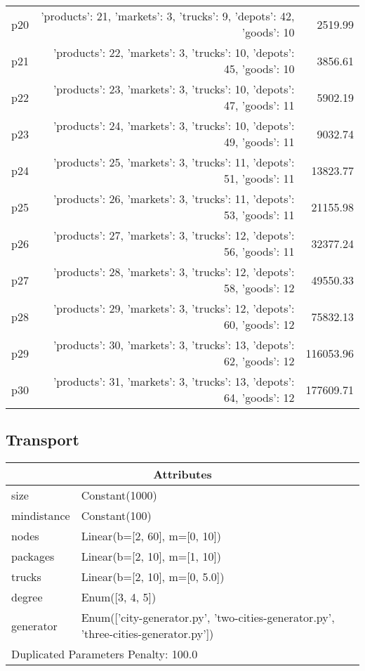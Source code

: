 \documentclass{article}
\begin{document}
\begin{center}
\begin{tabular}{@{}l|r|r@{}}
  p20&{'products': 21, 'markets': 3, 'trucks': 9, 'depots': 42, 'goods': 10}&2519.99\\
  p21&{'products': 22, 'markets': 3, 'trucks': 10, 'depots': 45, 'goods': 10}&3856.61\\
  p22&{'products': 23, 'markets': 3, 'trucks': 10, 'depots': 47, 'goods': 11}&5902.19\\
  p23&{'products': 24, 'markets': 3, 'trucks': 10, 'depots': 49, 'goods': 11}&9032.74\\
  p24&{'products': 25, 'markets': 3, 'trucks': 11, 'depots': 51, 'goods': 11}&13823.77\\
  p25&{'products': 26, 'markets': 3, 'trucks': 11, 'depots': 53, 'goods': 11}&21155.98\\
  p26&{'products': 27, 'markets': 3, 'trucks': 12, 'depots': 56, 'goods': 11}&32377.24\\
  p27&{'products': 28, 'markets': 3, 'trucks': 12, 'depots': 58, 'goods': 12}&49550.33\\
  p28&{'products': 29, 'markets': 3, 'trucks': 12, 'depots': 60, 'goods': 12}&75832.13\\
  p29&{'products': 30, 'markets': 3, 'trucks': 13, 'depots': 62, 'goods': 12}&116053.96\\
  p30&{'products': 31, 'markets': 3, 'trucks': 13, 'depots': 64, 'goods': 12}&177609.71
                            \end{tabular}
                            \end{center}
                    
                            \newpage \subsection{Transport}
                    \begin{center}
                    \begin{tabular}{@{}p{}p{}@{}}
                    \multicolumn{2}{c}{\bf \large Attributes}\\\midrule
                    size & Constant(1000)\\
mindistance & Constant(100)\\
nodes & Linear(b=[2, 60], m=[0, 10])\\
packages & Linear(b=[2, 10], m=[1, 10])\\
trucks & Linear(b=[2, 10], m=[0, 5.0])\\
degree & Enum([3, 4, 5])\\
generator & Enum(['city-generator.py', 'two-cities-generator.py', 'three-cities-generator.py']) \\\midrule
                    \multicolumn{2}{l}{Duplicated Parameters Penalty: 100.0}
                    \end{tabular}
                    \end{center}
                
\end{document}
